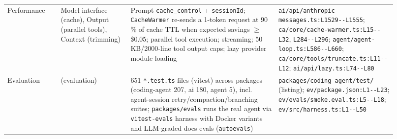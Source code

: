\begin{longtable}{@{}p{0.13\linewidth}p{0.17\linewidth}p{0.36\linewidth}p{0.26\linewidth}@{}}
Performance & Model interface (cache), Output (parallel tools), Context (trimming) & Prompt \texttt{cache\_\allowbreak{}control} + \texttt{sessionId}; \texttt{CacheWarmer} re-sends a 1-token request at 90 \% of cache TTL when expected savings $\geq$ \$0.05; parallel tool execution; streaming; 50 KB/2000-line tool output caps; lazy provider module loading & \texttt{ai/\allowbreak{}api/\allowbreak{}anthropic-\allowbreak{}messages.\allowbreak{}ts:\allowbreak{}L1529-\allowbreak{}-\allowbreak{}L1555}; \texttt{ca/\allowbreak{}core/\allowbreak{}cache-\allowbreak{}warmer.\allowbreak{}ts:\allowbreak{}L15-\allowbreak{}-\allowbreak{}L32}, \texttt{L284-\allowbreak{}-\allowbreak{}L296}; \texttt{agent/\allowbreak{}agent-\allowbreak{}loop.\allowbreak{}ts:\allowbreak{}L586-\allowbreak{}-\allowbreak{}L660}; \texttt{ca/\allowbreak{}core/\allowbreak{}tools/\allowbreak{}truncate.\allowbreak{}ts:\allowbreak{}L11-\allowbreak{}-\allowbreak{}L12}; \texttt{ai/\allowbreak{}api/\allowbreak{}lazy.\allowbreak{}ts:\allowbreak{}L74-\allowbreak{}-\allowbreak{}L80} \\
Evaluation & (evaluation) & 651 \texttt{*.\allowbreak{}test.\allowbreak{}ts} files (vitest) across packages (coding-agent 207, ai 180, agent 5), incl. agent-session retry/compaction/branching suites; \texttt{packages/\allowbreak{}evals} runs the real agent via \texttt{vitest-\allowbreak{}evals} harness with Docker variants and LLM-graded docs evals (\texttt{autoevals}) & \texttt{packages/\allowbreak{}coding-\allowbreak{}agent/\allowbreak{}test/\allowbreak{}} (listing); \texttt{ev/\allowbreak{}package.\allowbreak{}json:\allowbreak{}L1-\allowbreak{}-\allowbreak{}L23}; \texttt{ev/\allowbreak{}evals/\allowbreak{}smoke.\allowbreak{}eval.\allowbreak{}ts:\allowbreak{}L5-\allowbreak{}-\allowbreak{}L18}; \texttt{ev/\allowbreak{}src/\allowbreak{}harness.\allowbreak{}ts:\allowbreak{}L1-\allowbreak{}-\allowbreak{}L50} \\
\bottomrule \end{longtable}

